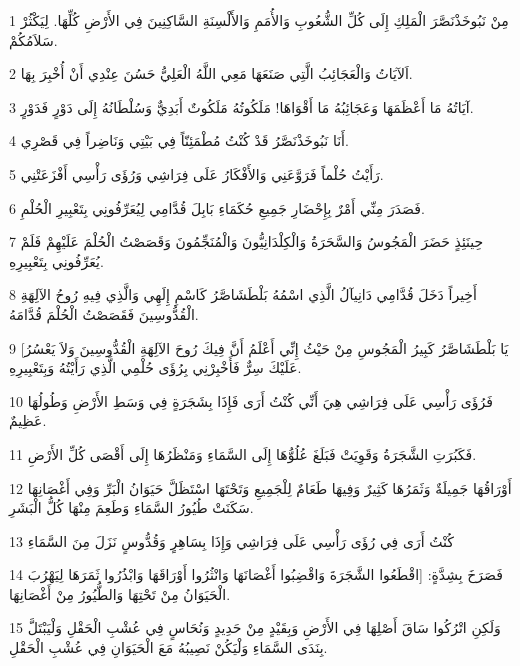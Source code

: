 \par 1 مِنْ نَبُوخَذْنَصَّرَ الْمَلِكِ إِلَى كُلِّ الشُّعُوبِ وَالأُمَمِ وَالأَلْسِنَةِ السَّاكِنِينَ فِي الأَرْضِ كُلِّهَا. لِيَكْثُرْ سَلاَمُكُمْ.
\par 2 اَلآيَاتُ وَالْعَجَائِبُ الَّتِي صَنَعَهَا مَعِي اللَّهُ الْعَلِيُّ حَسُنَ عِنْدِي أَنْ أُخْبِرَ بِهَا.
\par 3 آيَاتُهُ مَا أَعْظَمَهَا وَعَجَائِبُهُ مَا أَقْوَاهَا! مَلَكُوتُهُ مَلَكُوتٌ أَبَدِيٌّ وَسُلْطَانُهُ إِلَى دَوْرٍ فَدَوْرٍ.
\par 4 أَنَا نَبُوخَذْنَصَّرُ قَدْ كُنْتُ مُطْمَئِنّاً فِي بَيْتِي وَنَاضِراً فِي قَصْرِي.
\par 5 رَأَيْتُ حُلْماً فَرَوَّعَنِي وَالأَفْكَارُ عَلَى فِرَاشِي وَرُؤَى رَأْسِي أَفْزَعَتْنِي.
\par 6 فَصَدَرَ مِنِّي أَمْرٌ بِإِحْضَارِ جَمِيعِ حُكَمَاءِ بَابِلَ قُدَّامِي لِيُعَرِّفُونِي بِتَعْبِيرِ الْحُلْمِ.
\par 7 حِينَئِذٍ حَضَرَ الْمَجُوسُ وَالسَّحَرَةُ وَالْكِلْدَانِيُّونَ وَالْمُنَجِّمُونَ وَقَصَصْتُ الْحُلْمَ عَلَيْهِمْ فَلَمْ يُعَرِّفُونِي بِتَعْبِيرِهِ.
\par 8 أَخِيراً دَخَلَ قُدَّامِي دَانِيآلُ الَّذِي اسْمُهُ بَلْطَشَاصَّرُ كَاسْمِ إِلَهِي وَالَّذِي فِيهِ رُوحُ الآلِهَةِ الْقُدُّوسِينَ فَقَصَصْتُ الْحُلْمَ قُدَّامَهُ.
\par 9 [يَا بَلْطَشَاصَّرُ كَبِيرُ الْمَجُوسِ مِنْ حَيْثُ إِنِّي أَعْلَمُ أَنَّ فِيكَ رُوحَ الآلِهَةِ الْقُدُّوسِينَ وَلاَ يَعْسُرُ عَلَيْكَ سِرٌّ فَأَخْبِرْنِي بِرُؤَى حُلْمِي الَّذِي رَأَيْتُهُ وَبِتَعْبِيرِهِ.
\par 10 فَرُؤَى رَأْسِي عَلَى فِرَاشِي هِيَ أَنِّي كُنْتُ أَرَى فَإِذَا بِشَجَرَةٍ فِي وَسَطِ الأَرْضِ وَطُولُهَا عَظِيمٌ.
\par 11 فَكَبُرَتِ الشَّجَرَةُ وَقَوِيَتْ فَبَلَغَ عُلُوُّهَا إِلَى السَّمَاءِ وَمَنْظَرُهَا إِلَى أَقْصَى كُلِّ الأَرْضِ.
\par 12 أَوْرَاقُهَا جَمِيلَةٌ وَثَمَرُهَا كَثِيرٌ وَفِيهَا طَعَامٌ لِلْجَمِيعِ وَتَحْتَهَا اسْتَظَلَّ حَيَوَانُ الْبَرِّ وَفِي أَغْصَانِهَا سَكَنَتْ طُيُورُ السَّمَاءِ وَطَعِمَ مِنْهَا كُلُّ الْبَشَرِ.
\par 13 كُنْتُ أَرَى فِي رُؤَى رَأْسِي عَلَى فِرَاشِي وَإِذَا بِسَاهِرٍ وَقُدُّوسٍ نَزَلَ مِنَ السَّمَاءِ
\par 14 فَصَرَخَ بِشِدَّةٍ: [اقْطَعُوا الشَّجَرَةَ وَاقْضِبُوا أَغْصَانَهَا وَانْثُرُوا أَوْرَاقَهَا وَابْذُرُوا ثَمَرَهَا لِيَهْرُبَ الْحَيَوَانُ مِنْ تَحْتِهَا وَالطُّيُورُ مِنْ أَغْصَانِهَا.
\par 15 وَلَكِنِ اتْرُكُوا سَاقَ أَصْلِهَا فِي الأَرْضِ وَبِقَيْدٍ مِنْ حَدِيدٍ وَنُحَاسٍ فِي عُشْبِ الْحَقْلِ وَلْيَبْتَلَّ بِنَدَى السَّمَاءِ وَلْيَكُنْ نَصِيبُهُ مَعَ الْحَيَوَانِ فِي عُشْبِ الْحَقْلِ.
